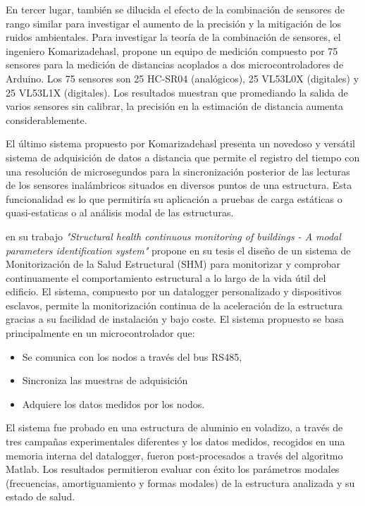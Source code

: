 \documentclass[12pt,letterpaper]{article}
\begin{document}
En tercer lugar, también se dilucida el efecto de la combinación de sensores de rango similar para investigar el aumento de la precisión y la mitigación de los ruidos ambientales. Para investigar la teoría de la combinación de sensores, el ingeniero Komarizadehasl, propone un equipo de medición compuesto por 75 sensores para la medición de distancias acoplados a dos microcontroladores de Arduino. Los 75 sensores son 25 HC-SR04 (analógicos), 25 VL53L0X (digitales) y 25 VL53L1X (digitales). Los resultados muestran que promediando la salida de varios sensores sin calibrar, la precisión en la estimación de distancia aumenta considerablemente.

El último sistema propuesto por Komarizadehasl presenta un novedoso y versátil sistema de adquisición de datos a distancia que permite el registro del tiempo con una resolución de microsegundos para la sincronización posterior de las lecturas de los sensores inalámbricos situados en diversos puntos de una estructura. Esta funcionalidad es lo que permitiría su aplicación a pruebas de carga estáticas o quasi-estaticas o al análisis modal de las estructuras.


\cite{muttillo2019structural} en su trabajo \textit{"Structural health continuous monitoring of buildings - A modal parameters identification system"} propone en su tesis el diseño de un sistema de Monitorización de la Salud Estructural (SHM) para monitorizar y comprobar continuamente el comportamiento estructural a lo largo de la vida útil del edificio. El sistema, compuesto por un datalogger personalizado y dispositivos esclavos, permite la monitorización continua de la aceleración de la estructura gracias a su facilidad de instalación y bajo coste. El sistema propuesto se basa principalmente en un microcontrolador que: 

\begin{itemize}
	\item Se comunica con los nodos a través del bus RS485, 
	\item Sincroniza las muestras de adquisición
	\item Adquiere los datos medidos por los nodos.
\end{itemize} 

El sistema fue probado en una estructura de aluminio en voladizo, a través de tres campañas experimentales diferentes y los datos medidos, recogidos en una memoria interna del datalogger, fueron post-procesados a través del algoritmo Matlab. Los resultados permitieron evaluar con éxito los parámetros modales (frecuencias, amortiguamiento y formas modales) de la estructura analizada y su estado de salud.
\end{document}
